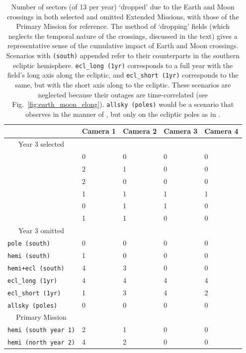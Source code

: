 \begin{table}[!tb]
	\centering
	\begin{tabular}{ | l | l | l | l | l | }
		\hline
		\ & Camera 1 & Camera 2 & Camera 3 & Camera 4 \\ \hline
		\multicolumn{1}{|c|}{Year 3 selected} & \  & \  & \  & \  \\ \hline
		\npole & 0 & 0 & 0 & 0 \\ \hline
		\nhemi & 2 & 1 & 0 & 0 \\ \hline
		\shemiAvoid & 2 & 0 & 0 & 0 \\ \hline
		\elong & 1 & 1 & 1 & 1 \\ \hline
		\eshort & 0 & 1 & 1 & 0 \\ \hline
		\hemis & 1 & 1 & 0 & 0 \\ \hline
		\multicolumn{1}{|c|}{Year 3 omitted} & \  & \  & \  & \  \\ \hline
		\texttt{pole\,(south)}  & 0 & 0 & 0 & 0 \\ \hline
		\texttt{hemi\,(south)} & 1 & 0 & 0 & 0 \\ \hline
		\texttt{hemi+ecl\,(south)} & 4 & 3 & 0 & 0 \\ \hline
		\texttt{ecl\_long\,(1yr)} & 4 & 4 & 4 & 4 \\ \hline
		\texttt{ecl\_short\,(1yr)} & 1 & 3 & 4 & 2 \\ \hline
		\texttt{allsky\,(poles)} & 0 & 0 & 0 & 0 \\ \hline
		\multicolumn{1}{|c|}{Primary Mission} & \  & \  & \  & \  \\ \hline
		\texttt{hemi\,(south year 1)} & 2 & 1 & 0 & 0 \\ \hline
		\texttt{hemi\,(north year 2)} & 4 & 2 & 0 & 0 \\ \hline
	\end{tabular}
	\caption{Number of sectors (of 13 per year) `dropped' due to the Earth and Moon crossings in both selected and omitted Extended Missions, with those of the Primary Mission for reference. The method of `dropping' fields (which neglects the temporal nature of the crossings, discussed in the text) gives a representative sense of the cumulative impact of Earth and Moon crossings. 
		Scenarios with \texttt{(south)} appended refer to their counterparts in the southern ecliptic hemisphere.
		\texttt{ecl\_long\,(1yr)} corresponds to a full year with the \tess field's long axis along the ecliptic, and \texttt{ecl\_short\,(1yr)} corresponds to the same, but with the short axis along to the ecliptic. These scenarios are neglected because their outages are time-correlated (see Fig.~\protect\ref{fig:earth_moon_elong}).
		\texttt{allsky\,(poles)} would be a scenario that observes in the manner of \hemis, but only on the ecliptic poles as in \npole.}
	\label{tab:dropped_fields}
\end{table}


